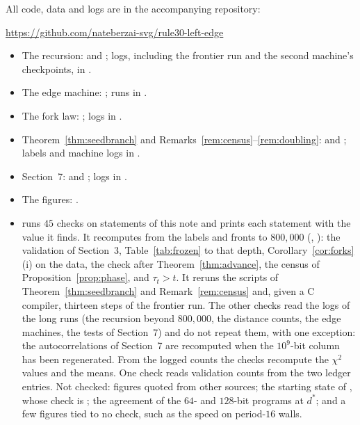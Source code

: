 \documentclass[11pt]{article}
\theoremstyle{definition}
\theoremstyle{remark}
\newcommand{\dstar}{d^{*}}
\begin{document}
All code, data and logs are in the accompanying repository:
\begin{center}\url{https://github.com/nateberzai-svg/rule30-left-edge}\end{center}
\begin{sloppypar}
\begin{itemize}[leftmargin=*,itemsep=1pt]
\item The recursion:  and ; logs, including the frontier run and the second machine's checkpoints, in .
\item The edge machine: ; runs in .
\item The fork law: ; logs in .
\item Theorem~\ref{thm:seedbranch} and Remarks~\ref{rem:census}--\ref{rem:doubling}:  and ; labels and machine logs in .
\item Section~7:  and ; logs in .
\item The figures: .
\item {} runs $45$ checks on statements of this note and prints each statement with the value it finds. It recomputes from the labels and fronts to $800{,}000$ (, ): the validation of Section~3, Table~\ref{tab:frozen} to that depth, Corollary~\ref{cor:forks}(i) on the data, the check after Theorem~\ref{thm:advance}, the census of Proposition~\ref{prop:phase}, and $\tau_t>t$. It reruns the scripts of Theorem~\ref{thm:seedbranch} and Remark~\ref{rem:census} and, given a C compiler, thirteen steps of the frontier run. The other checks read the logs of the long runs (the recursion beyond $800{,}000$, the distance counts, the edge machines, the tests of Section~7) and do not repeat them, with one exception: the autocorrelations of Section~7 are recomputed when the $10^9$-bit column has been regenerated. From the logged counts the checks recompute the $\chi^2$ values and the means. One check reads validation counts from the two ledger entries. Not checked: figures quoted from other sources; the starting state of \cite{Lania}, whose check is ; the agreement of the $64$- and $128$-bit programs at $\dstar$; and a few figures tied to no check, such as the speed on period-$16$ walls.
\end{itemize}
\end{sloppypar}
\end{document}
